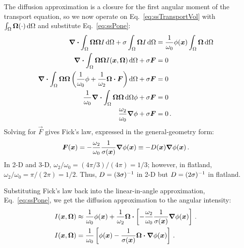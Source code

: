 The diffusion approximation is a closure for the first angular moment of
the transport equation, so we now operate on Eq.~\eqref{eq:ssTransportVol} with
$\int_\Omega \bm{\Omega} (\cdot) \mathop{}\!\mathrm{d} \Omega$ and substitute
Eq.~\eqref{eq:ssPone}:
\begin{align*}
  \bm{\nabla} \bm{\cdot} \int_\Omega \bm{\Omega} \bm{\Omega} I
  \mathop{}\!\mathrm{d}\Omega
  + \sigma \int_\Omega \bm{\Omega} I \mathop{}\!\mathrm{d}\Omega
  &= \frac{1}{\omega_0} \phi(\bm{x}) \int_\Omega \bm{\Omega} \mathop{}\!\mathrm{d}\Omega
  \\
  \bm{\nabla} \bm{\cdot} \int_\Omega \bm{\Omega} \bm{\Omega} I(\bm{x}, \bm{\Omega})
  \mathop{}\!\mathrm{d}\Omega
  + \sigma \bm{F}
  &= 0
  \\
  \bm{\nabla} \bm{\cdot} \int_\Omega \bm{\Omega} \bm{\Omega} \left(
  \frac{1}{\omega_0}\phi + \frac{1}{\omega_2} \bm{\Omega} \bm{\cdot} \bm{F}
  \right) \mathop{}\!\mathrm{d}\Omega
  + \sigma \bm{F}
  &= 0
  \\
  \frac{1}{\omega_0} \bm{\nabla} \bm{\cdot} \int_\Omega \bm{\Omega} \bm{\Omega}
  \mathop{}\!\mathrm{d}\Omega \phi 
  + \sigma \bm{F} &= 0
  \\
  \frac{\omega_2}{\omega_0} \bm{\nabla} \phi + \sigma \bm{F} &= 0 \,.
\end{align*}
Solving for $\vec{F}$ gives Fick's law, expressed in the general-geometry form:
\begin{equation} \label{eq:fickGeneral}
  \bm{F}(\bm{x})
  = - \frac{\omega_2}{\omega_0} \frac{1}{\sigma(\bm{x})} \bm{\nabla} \phi(\bm{x})
  \equiv -D(\bm{x}) \bm{\nabla} \phi(\bm{x})\,.
\end{equation}
In 2-D and 3-D, $\omega_2/\omega_0 = (4\pi / 3) / (4\pi) = 1/3$; however, in
flatland, $\omega_2/\omega_0 = \pi / (2\pi) = 1/2$. Thus, $D=(3\sigma)^{-1}$ in
2-D but $D=(2\sigma)^{-1}$ in flatland.

Substituting Fick's law back into the linear-in-angle approximation,
Eq.~\eqref{eq:ssPone}, we get the diffusion approximation to the angular
intensity:
\begin{align} \nonumber
  I(\bm{x}, \bm{\Omega})
  &\approx \frac{1}{\omega_0} \phi(\bm{x})
  + \frac{1}{\omega_2} \bm{\Omega} \bm{\cdot} \left[ - \frac{\omega_2}{\omega_0}
  \frac{1}{\sigma(\bm{x})} \bm{\nabla} \phi(\bm{x}) \right]\,.
  \\ \label{eq:diffusionIntensity}
  I(\bm{x}, \bm{\Omega})
  &= \frac{1}{\omega_0} \left[ \phi(\bm{x})
  - \frac{1}{\sigma(\bm{x})}
  \bm{\Omega} \bm{\cdot} \bm{\nabla} \phi(\bm{x}) \right] \,.
\end{align}

